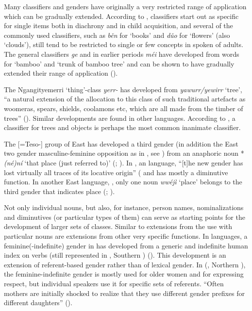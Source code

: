 \documentclass[output=collectionpaper]{langsci/langscibook}
\begin{document}
Many classifiers and genders have originally a very restricted range of application which can be gradually extended. According to \cite[428]{Erbaugh1986},  classifiers start out as specific for single items both in diachrony and in child acquisition, and several of the commonly used  classifiers, such as \textit{b\v{e}n} for `books' and \textit{d\v{u}o} for `flowers' (also `clouds'), still tend to be restricted to single or few concepts in spoken  of adults. The  general classifiers  \textit{ge} and in earlier periods \textit{méi} have developed from words for `bamboo' and `trunk of bamboo tree' and can be shown to have gradually extended their range of application (\citealt[429]{Erbaugh1986}).

The Ngan\textquotesingle{}gityemerri `thing'-class \textit{yerr-} has developed from \textit{yawurr/yewirr} `tree', ``a natural extension of the allocation to this class of such traditional artefacts as woomeras, spears, shields, coolamons etc, which are all made from the timber of trees'' (\citealt[309]{Reid1990}). Similar developments are found in other  languages. According to \cite[300]{Allan1977}, a classifier for trees and objects is perhaps the most common inanimate classifier.

The  [=Teso-] group of East  has developed a third gender (in addition the East  two gender masculine-feminine opposition as in , see ) from an anaphoric noun *\textit{(né)ní} `that place (just referred to)' (\citealt[219]{Dimmendaal1983}; \citealt[228]{Heine1984}). In , an  language, ``[t]he new gender has lost virtually all traces of its locative origin'' (\citealt[229]{Heine1984} and has mostly a diminutive function. In another East  language, , only one noun \textit{wwéjì} `place' belongs to the third gender that indicates place (\citealt[15]{Tucker1955}; \citealt[160]{Payne1998}).

Not only individual nouns, but also, for instance, person names, nominalizations and diminutives (or particular types of them) can serve as starting points for the development of larger sets of classes. Similar to extensions from the use with particular nouns are extensions from other very specific functions. In  languages, a feminine(-indefinite) gender in  has developed from a generic and indefinite human index on verbs (still represented in , Southern ) (\citealt[141]{Mithun2014}). This development is an extension of referent-based gender rather than of lexical gender. In  (, Northern ), the feminine-indefinite gender is mostly used for older women and for expressing respect, but individual speakers use it for specific sets of referents. ``Often mothers are initially shocked to realize that they use different gender prefixes for different daughters'' (\citealt[138]{Mithun2014}).
\end{document}
